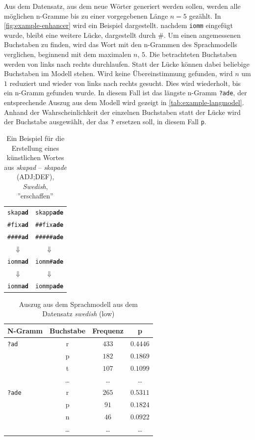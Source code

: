 \documentclass[a4paper]{article}
\newcommand{\lang}[1]{\textit{#1}}
\begin{document}
Aus dem Datensatz, aus dem neue Wörter generiert werden sollen, werden alle möglichen n-Gramme bis zu einer vorgegebenen Länge $n=5$ gezählt. In \autoref{fig:example-enhancer} wird ein Beispiel dargestellt. nachdem \texttt{iomm} eingefügt wurde, bleibt eine weitere Lücke, dargestellt durch \#. Um einen angemessenen Buchstaben zu finden, wird das Wort mit den n-Grammen des Sprachmodells verglichen, beginnend mit dem maximalen $n$, $5$. Die betrachteten Buchstaben werden von links nach rechts durchlaufen. Statt der Lücke können dabei beliebige Buchstaben im Modell stehen. Wird keine Übereinstimmung gefunden, wird $n$ um $1$ reduziert und wieder von links nach rechts gesucht. Dies wird wiederholt, bis ein n-Gramm gefunden wurde. In diesem Fall ist das längste n-Gramm \texttt{?ade}, der entsprechende Auszug aus dem Modell wird gezeigt in \autoref{tab:example-langmodel}. Anhand der Wahrscheinlichkeit der einzelnen Buchstaben statt der Lücke wird der Buchstabe ausgewählt, der das \texttt{?} ersetzen soll, in diesem Fall \texttt{p}.

\begin{table}
\centering
\begin{tabular}{cc}
\toprule
\texttt{skap\textbf{ad}} & \texttt{skapp\textbf{ade}}\\  %
\texttt{\#fix\textbf{ad}} & \texttt{\#\#fix\textbf{ade}}\\ \midrule
\texttt{\#\#\#\#\textbf{ad}} & \texttt{\#\#\#\#\#\textbf{ade}} \\
$\Downarrow$ & $\Downarrow$\\
\texttt{iomm\textbf{ad}} & \texttt{iomm\#\textbf{ade}}\\
$\Downarrow$ & $\Downarrow$\\
\texttt{iomm\textbf{ad}} & \texttt{iommp\textbf{ade}}\\
\bottomrule
\end{tabular}
\caption{Ein Beispiel für die Erstellung eines künstlichen Wortes aus \textit{skapad} -- \textit{skapade} (ADJ;DEF), \lang{Swedish}, ''erschaffen''}
\label{fig:example-enhancer}
\end{table}

\begin{table}
\centering
\begin{tabular}{lccc}
\toprule
N-Gramm & Buchstabe & Frequenz & p\\ \midrule
 \texttt{?ad} & r & $433$ & $0.4446$ \\
 & p & $182$ & $0.1869$\\
 & t & $107$ & $0.1099$\\ 
& \ldots & \ldots & \ldots \\ \midrule
\texttt{?ade} & r & $265$ & $0.5311$\\
 & p & $91$ & $0.1824$\\
 & n & $46$ & $0.0922$ \\
 & \ldots & \ldots & \ldots \\ 
 \bottomrule
\end{tabular}
\caption{Auszug aus dem Sprachmodell aus dem Datensatz \lang{swedish} (low)}
\label{tab:example-langmodel}
\end{table}
\end{document}
